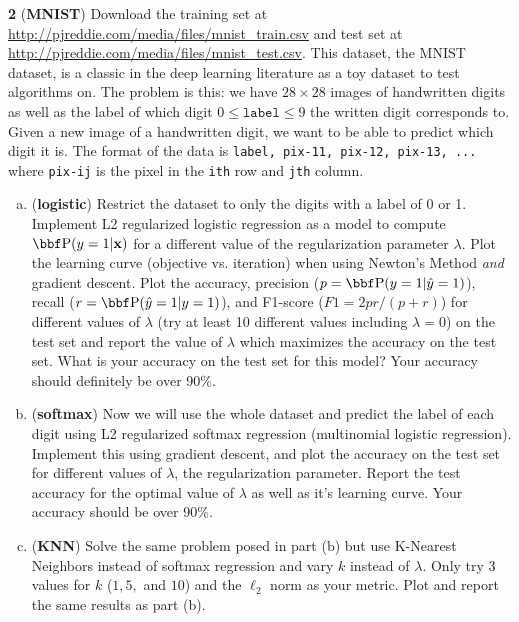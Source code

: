 \documentclass[12pt,letterpaper,fleqn]{hmcpset}
\begin{document}
\newpage

\textbf{2} (\textbf{MNIST}) Download the training set at 
\url{http://pjreddie.com/media/files/mnist_train.csv} and test set at
\url{http://pjreddie.com/media/files/mnist_test.csv}. This dataset, the MNIST
dataset, is a classic in the deep learning literature as a toy dataset to test
algorithms on. The problem is this: we have $28\times 28$ images of handwritten
digits as well as the label of which digit $0 \leq \texttt{label} \leq 9$ the written
digit corresponds to. Given a new image of a handwritten digit, we want to be
able to predict which digit it is.
The format of the data is \texttt{label, pix-11, pix-12, pix-13, ...}
where \texttt{pix-ij} is the pixel in the \texttt{ith} row and \texttt{jth} column.
\begin{enumerate}[(a)]
    \item (\textbf{logistic}) Restrict the dataset to only the digits with a label
        of 0 or 1. Implement L2 regularized logistic regression as a model to compute
        $\PP(y=1|\xx)$ for a different value of the regularization parameter $\lambda$.
        Plot the learning curve (objective vs. iteration) when using Newton's Method
        \textit{and} gradient descent.
        Plot the accuracy, precision ($p = \PP(y=1 | \hat y=1)$), recall ($r = \PP(\hat y=1 | y=1)$),
        and F1-score ($F1 = 2pr / (p+r)$) for different values of $\lambda$ (try at least
        10 different values including $\lambda = 0$) on the test set and report the
        value of $\lambda$ which maximizes the accuracy on the test set. What is your
        accuracy on the test set for this model? Your accuracy should definitely be
        over 90\%.

    \item (\textbf{softmax}) Now we will use the whole dataset and predict the label
        of each digit using L2 regularized softmax regression (multinomial logistic
        regression). Implement this using gradient descent, and plot the accuracy
        on the test set for different values of $\lambda$, the regularization parameter.
        Report the test accuracy for the optimal value of $\lambda$ as well as it's
        learning curve. Your accuracy should be over 90\%.

    \item (\textbf{KNN}) Solve the same problem posed in part (b) but use
        K-Nearest Neighbors instead of softmax regression and vary $k$ instead
        of $\lambda$. Only try 3 values for $k$ ($1,5,$ and $10$) and the $\ell_2$
        norm as your metric. Plot and report the same results as part (b).
\end{enumerate}
\end{document}
